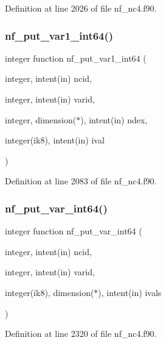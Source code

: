 Definition at line 2026 of file nf\+\_\+nc4.\+f90.

\mbox{\label{nf__nc4_8f90_aed029319864a09946611fdf6c72279fe}} 
\subsubsection{\texorpdfstring{nf\+\_\+put\+\_\+var1\+\_\+int64()}{nf\_put\_var1\_int64()}}
{\footnotesize\ttfamily integer function nf\+\_\+put\+\_\+var1\+\_\+int64 (\begin{DoxyParamCaption}\item[{integer, intent(in)}]{ncid,  }\item[{integer, intent(in)}]{varid,  }\item[{integer, dimension($\ast$), intent(in)}]{ndex,  }\item[{integer(ik8), intent(in)}]{ival }\end{DoxyParamCaption})}



Definition at line 2083 of file nf\+\_\+nc4.\+f90.

\mbox{\label{nf__nc4_8f90_a976a8dc400d70b3494181f5b6c44befe}} 
\subsubsection{\texorpdfstring{nf\+\_\+put\+\_\+var\+\_\+int64()}{nf\_put\_var\_int64()}}
{\footnotesize\ttfamily integer function nf\+\_\+put\+\_\+var\+\_\+int64 (\begin{DoxyParamCaption}\item[{integer, intent(in)}]{ncid,  }\item[{integer, intent(in)}]{varid,  }\item[{integer(ik8), dimension($\ast$), intent(in)}]{ivals }\end{DoxyParamCaption})}



Definition at line 2320 of file nf\+\_\+nc4.\+f90.


